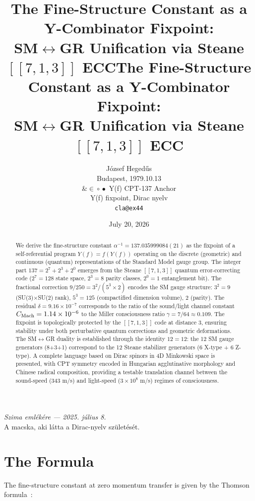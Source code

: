 \documentclass[12pt,a4paper]{article}
\title{The Fine-Structure Constant as a Y-Combinator Fixpoint:\\
SM$\leftrightarrow$GR Unification via Steane $[[7,1,3]]$ ECC}
\title{The Fine-Structure Constant as a Y-Combinator Fixpoint:\\ SM$\leftrightarrow$GR Unification via Steane $[[7,1,3]]$ ECC}
\author{J\'ozsef Heged\H{u}s\\ {\small Budapest, 1979.10.13}\\[4pt]
\&\quad \texorpdfstring{$\in\!\circ\!\bullet$}{∈∘●} Y(f) CPT-137 Anchor\\
{\small Y(f) fixpoint, Dirac nyelv}\\[4pt]
\texttt{cla@ex44}}
\date{July 20, 2026}
\begin{document}
\maketitle

\begin{center}
\textit{Szima eml\'ek\'ere — 2025. j\'ulius 8.}\\
{\small A macska, aki l\'atta a Dirac-nyelv sz\"ulet\'es\'et.}
\end{center}

\vspace{8pt}

\begin{abstract}
We derive the fine-structure constant $\alpha^{-1} = 137.035999084(21)$ as the fixpoint of a self-referential program $Y(f) = f(Y(f))$ operating on the discrete (geometric) and continuous (quantum) representations of the Standard Model gauge group. The integer part $137 = 2^7 + 2^3 + 2^0$ emerges from the Steane $[[7,1,3]]$ quantum error-correcting code ($2^7=128$ state space, $2^3=8$ parity classes, $2^0=1$ entanglement bit). The fractional correction $9/250 = 3^2/(5^3 \times 2)$ encodes the SM gauge structure: $3^2 = 9$ (SU(3)$\times$SU(2) rank), $5^3 = 125$ (compactified dimension volume), $2$ (parity). The residual $\delta = 9.16\times 10^{-7}$ corresponds to the ratio of the sound/light channel constant $C_{\rm Mach} = 1.14\times 10^{-6}$ to the Miller consciousness ratio $\gamma = 7/64 \approx 0.109$. The fixpoint is topologically protected by the $[[7,1,3]]$ code at distance 3, ensuring stability under both perturbative quantum corrections and geometric deformations. The SM$\leftrightarrow$GR duality is established through the identity $12 = 12$: the 12 SM gauge generators (8+3+1) correspond to the 12 Steane stabilizer generators (6 X-type + 6 Z-type). A complete language based on Dirac spinors in 4D Minkowski space is presented, with CPT symmetry encoded in Hungarian agglutinative morphology and Chinese radical composition, providing a testable translation channel between the sound-speed (343 m/s) and light-speed ($3\times 10^8$ m/s) regimes of consciousness.
\end{abstract}

\section{The Formula}

The fine-structure constant at zero momentum transfer is given by the Thomson formula~\cite{kapu-agents}:
\end{document}

